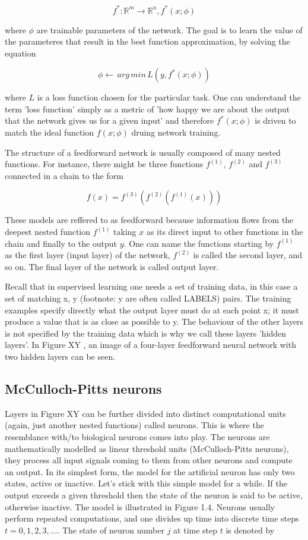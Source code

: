 $$ f^*: \mathbb{R}^m \rightarrow \mathbb{R}^n, f^*(x;\phi) $$

where $ \phi $ are trainable parameters of the network. The goal is to learn the value of the parameteres that result in the best function approximation, by solving the equation

$$ \phi \leftarrow \, arg \, min \, L(y, f^*(x;\phi)) $$

where $ L $ is a loss function chosen for the particular task. One can understand the term 'loss function' simply as a metric of 'how happy we are about the output that the network gives us for a given input' and therefore $f^*(x;\phi)$ is driven to match the ideal function $f(x;\phi)$ druing network training. 

The structure of a feedforward network is usually composed of many nested functions. For instance, there might be three functions $f^{(1)}$, $f^{(2)}$ and $f^{(3)}$ connected in a chain to the form

$$ f(x) = f^{(3)}(f^{(2)}(f^{(1)}(x))) $$

These models are reffered to as feedforward because information flows from the deepest nested function $f^{(1)}$ taking $ x $ as its direct input to other functions in the chain and finally to the output $ y $. One can name the functions starting by $f^{(1)}$ as the first layer (input layer) of the network, $f^{(2)}$ is called the second layer, and so on. The final layer of the network is called output layer. 

Recall that in supervised learning one needs a set of training data, in this case a set of matching x, y (footnote: y are often called LABELS) pairs. The training examples specify directly what the output layer must do at each point x; it must produce a value that is as close as possible to y. The behaviour of the other layers is not specified by the training data which is why we call these layers 'hidden layers'. In Figure XY , an image of a four-layer feedforward neural network with two hidden layers can be seen.

\subsection{McCulloch-Pitts neurons}

Layers in Figure XY can be further divided into distinct computational units (again, just another nested functions) called neurons. This is where the resemblance with/to biological neurons comes into play. The neurons are mathematically modelled as linear threshold units (McCulloch-Pitts neurons), they process all input signals coming to them from other neurons and compute an output. In its simplest form, the model for the artificial neuron has only two states, active or inactive. Let's stick with this simple model for a while. If the output exceeds a given threshold then the state of the neuron is said to be active, otherwise inactive. The model is illustrated in Figure 1.4. Neurons usually perform repeated computations, and one divides up time into discrete time steps $ t = 0,1,2,3,.... $ The state of neuron number $ j $ at time step $ t $ is denoted by


